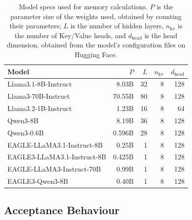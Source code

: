 \begin{table}[t]
\centering
\small
\setlength{\tabcolsep}{4pt}
\begin{tabular}{l|rrrr}
\toprule
Model & $P$ & $L$ & $n_\text{kv}$ & $d_\text{head}$ \\
\midrule
Llama3.1-8B-Instruct  & 8.03B & 32 & 8 & 128 \\
Llama3-70B-Instruct   & 70.55B & 80 & 8 & 128 \\
Llama3.2-1B-Instruct  & 1.23B & 16 & 8 & 64 \\
Qwen3-8B              & 8.19B & 36 & 8 & 128 \\
Qwen3-0.6B              & 0.596B & 28 & 8 & 128 \\
EAGLE-LLaMA3.1-Instruct-8B & 0.25B & 1 & 8 & 128 \\
EAGLE3-LLaMA3.1-Instruct-8B & 0.425B & 1 & 8 & 128 \\
EAGLE-LLaMA3-Instruct-70B & 0.99B & 1 & 8 & 128 \\
EAGLE3-Qwen3-8B            &  0.40B     & 1 & 8 & 128 \\
\bottomrule
\end{tabular}
\vspace{2pt}
\caption{Model specs used for memory calculations. $P$ is the parameter size of the weights used, obtained by counting their parameters; $L$ is the number of hidden layers, $n_\text{kv}$ is the number of Key/Value heads, and $d_\text{head}$ is the head dimension, obtained from the model's configuration files on Hugging Face.}
\label{tab:mem_model_specs}
\vspace{-0.10in}
\end{table}


\subsection{Acceptance Behaviour}
\label{appendix:acc-behaviour}


